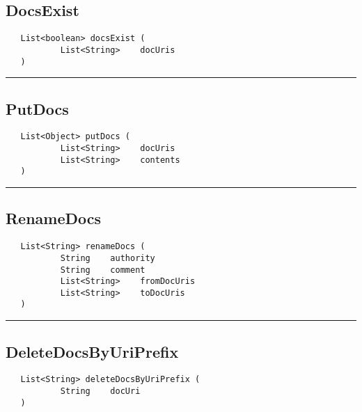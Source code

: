 \subsection{DocsExist}
\label{Api:DocsExist}
\begin{verbatim}
   List<boolean> docsExist (
           List<String>    docUris
   )
\end{verbatim}



\rule{15cm}{2pt}
\subsection{PutDocs}
\label{Api:PutDocs}
\begin{verbatim}
   List<Object> putDocs (
           List<String>    docUris
           List<String>    contents
   )
\end{verbatim}



\rule{15cm}{2pt}
\subsection{RenameDocs}
\label{Api:RenameDocs}
\begin{verbatim}
   List<String> renameDocs (
           String    authority
           String    comment
           List<String>    fromDocUris
           List<String>    toDocUris
   )
\end{verbatim}



\rule{15cm}{2pt}
\subsection{DeleteDocsByUriPrefix}
\label{Api:DeleteDocsByUriPrefix}
\begin{verbatim}
   List<String> deleteDocsByUriPrefix (
           String    docUri
   )
\end{verbatim}



